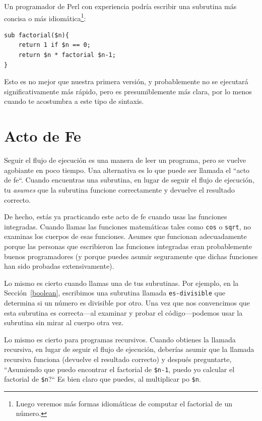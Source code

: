 Un programador de Perl con experiencia podría escribir una
subrutina más concisa o más idiomática\footnote{Luego veremos 
más formas idiomáticas de computar el factorial de un número.}:

\begin{lstlisting}
sub factorial($n){
    return 1 if $n == 0;
    return $n * factorial $n-1;
}
\end{lstlisting}
%
Esto es no mejor que nuestra primera versión, y probablemente
no se ejecutará significativamente más rápido, pero es presumiblemente
más clara, por lo menos cuando te acostumbra a este tipo de sintaxis.

\section{Acto de Fe}

Seguir el flujo de ejecución es una manera de leer un programa,
pero se vuelve agobiante en poco tiempo. Una alternativa es 
lo que puede ser llamada el ``acto de fe``. Cuando encuentras 
una subrutina, en lugar de seguir el flujo de ejecución,
tu \emph{asumes} que la subrutina funcione correctamente y devuelve
el resultado correcto.


De hecho, estás ya practicando este acto de fe cuando usas las funciones
integradas. Cuando llamas las funciones matemáticas tales como {\tt cos} 
o {\tt sqrt}, no examinas los cuerpos de esas funciones. Asumes que funcionan
adecuadamente porque las personas que escribieron las funciones 
integradas eran probablemente buenos programadores (y porque puedes
asumir seguramente que dichas funciones han sido probadas extensivamente).

Lo mismo es cierto cuando llamas una de tus subrutinas. Por ejemplo,
en la Sección~\ref{boolean}, escribimos una subrutina llamada \verb|es-divisible|
que determina si un número es divisible por otro. Una vez que nos convencimos
que esta subrutina es correcta---al examinar y probar el código---podemos
usar la subrutina sin mirar al cuerpo otra vez.

Lo mismo es cierto para programas recursivos. Cuando obtienes la
llamada recursiva, en lugar de seguir el flujo de ejecución, deberías
asumir que la llamada recursiva funciona (devuelve el resultado correcto)
y después preguntarte, ``Asumiendo que puedo encontrar el factorial de
\verb|$n-1|, puedo yo calcular el factorial de \verb|$n|?`` Es bien claro 
que puedes, al multiplicar po \verb|$n|.

